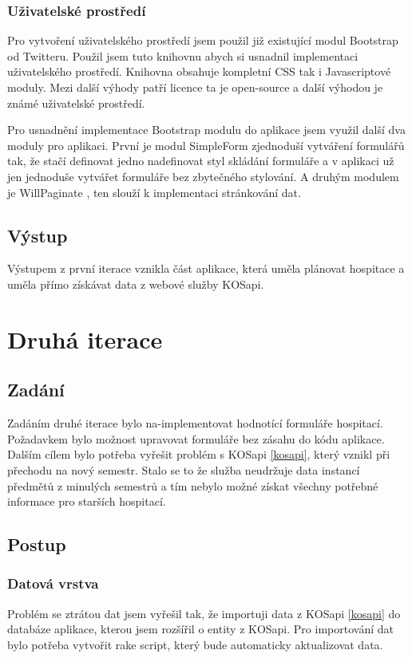 \subsubsection{Uživatelské prostředí}
Pro vytvoření uživatelského prostředí jsem použil již existující modul Bootstrap \cite{bootstrap} od Twitteru. Použil jsem tuto knihovnu abych si usnadnil implementaci uživatelského prostředí. Knihovna obsahuje kompletní CSS tak i Javascriptové moduly. Mezi další výhody patří licence ta je open-source a další výhodou je známé uživatelské prostředí.

Pro usnadnění implementace Bootstrap \cite{bootstrap} modulu do aplikace jsem využil další dva moduly pro aplikaci. První je modul SimpleForm \cite{simpleform} zjednoduší vytváření formulářů tak, že stačí definovat jedno nadefinovat styl skládání formuláře a v aplikaci už jen jednoduše vytvářet formuláře bez zbytečného stylování. A druhým modulem je WillPaginate \cite{willpaginate}, ten slouží k implementaci stránkování dat.

\subsection{Výstup} 
Výstupem z první iterace vznikla část aplikace, která uměla plánovat hospitace a uměla přímo získávat data z webové služby KOSapi.


\section{Druhá iterace}
\subsection{Zadání}
Zadáním druhé iterace bylo na-implementovat hodnotící formuláře hospitací. Požadavkem bylo možnost upravovat formuláře bez zásahu do kódu aplikace. Dalším cílem bylo potřeba vyřešit problém s KOSapi \ref{kosapi}, který vznikl při přechodu na nový semestr. Stalo se to že služba neudržuje data instancí předmětů z minulých semestrů a tím nebylo možné získat všechny potřebné informace pro starších hospitací.

\subsection{Postup}
\subsubsection{Datová vrstva}
Problém se ztrátou dat jsem vyřešil tak, že  importuji data z KOSapi \ref{kosapi} do databáze aplikace, kterou jsem rozšířil o entity z KOSapi. Pro importování dat bylo potřeba vytvořit rake script, který bude automaticky aktualizovat data.

